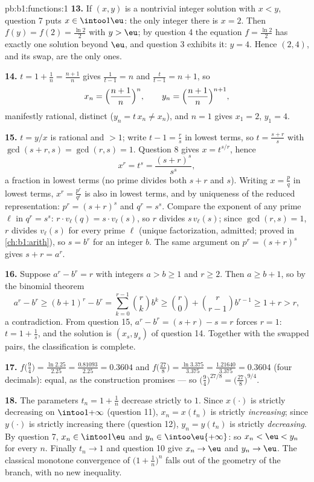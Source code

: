 \begin{solution}{pb:b1:functions:1}
\textbf{13.} If $(x, y)$ is a nontrivial integer solution with $x
< y$, question 7 puts $x \in \intoo1\eu$: the only integer there
is $x = 2$. Then $f(y) = f(2) = \frac{\ln2}2$ with $y > \eu$; by
question 4 the equation $f = \frac{\ln2}2$ has exactly one
solution beyond $\eu$, and question 3 exhibits it: $y = 4$. Hence
$(2, 4)$, and its swap, are the only ones.

\textbf{14.} $t = 1 + \frac1n = \frac{n+1}n$ gives $\frac1{t - 1}
= n$ and $\frac t{t-1} = n + 1$, so
\[
x_n = \Bigl(\frac{n+1}n\Bigr)^{n},
\qquad
y_n = \Bigl(\frac{n+1}n\Bigr)^{n+1},
\]
manifestly rational, distinct ($y_n = t\,x_n \neq x_n$), and $n =
1$ gives $x_1 = 2$, $y_1 = 4$.

\textbf{15.} $t = y/x$ is rational and $> 1$; write $t - 1 =
\frac rs$ in lowest terms, so $t = \frac{s + r}s$ with $\gcd(s +
r, s) = \gcd(r, s) = 1$. Question 8 gives $x = t^{s/r}$, hence
\[
x^r = t^s = \frac{(s+r)^s}{s^s} ,
\]
a fraction in lowest terms (no prime divides both $s + r$ and
$s$). Writing $x = \frac pq$ in lowest terms, $x^r = \frac{p^r}
{q^r}$ is also in lowest terms, and by uniqueness of the reduced
representation: $p^r = (s+r)^s$ and $q^r = s^s$. Compare the
exponent of any prime $\ell$ in $q^r = s^s$: $r \cdot
v_\ell(q) = s \cdot v_\ell(s)$, so $r$ divides $s\,v_\ell(s)$;
since $\gcd(r, s) = 1$, $r$ divides $v_\ell(s)$ for every prime
$\ell$ (unique factorization, admitted; proved in
\cref{ch:b1:arith}), so $s = b^r$ for an integer $b$. The same
argument on $p^r = (s+r)^s$ gives $s + r = a^r$.

\textbf{16.} Suppose $a^r - b^r = r$ with integers $a > b \geq 1$
and $r \geq 2$. Then $a \geq b + 1$, so by the binomial theorem
\[
a^r - b^r \geq (b+1)^r - b^r
= \sum_{k=0}^{r-1}\binom rk b^k
\geq \binom r0 + \binom r{r-1} b^{r-1}
\geq 1 + r > r ,
\]
a contradiction. From question 15, $a^r - b^r = (s + r) - s = r$
forces $r = 1$: $t = 1 + \frac1s$, and the solution is $(x_s,
y_s)$ of question 14. Together with the swapped pairs, the
classification is complete.

\textbf{17.} $f\bigl(\tfrac94\bigr) = \frac{\ln 2.25}{2.25} =
\frac{0.81093}{2.25} = 0.3604$ and $f\bigl(\tfrac{27}8\bigr) =
\frac{\ln 3.375}{3.375} = \frac{1.21640}{3.375} = 0.3604$ (four
decimals): equal, as the construction promises --- so
$\bigl(\tfrac94\bigr)^{27/8} = \bigl(\tfrac{27}8\bigr)^{9/4}$.

\textbf{18.} The parameters $t_n = 1 + \frac1n$ decrease strictly
to $1$. Since $x(\cdot)$ is strictly decreasing on
$\intoo1{+\infty}$ (question 11), $x_n = x(t_n)$ is strictly
\emph{increasing}; since $y(\cdot)$ is strictly increasing there
(question 12), $y_n = y(t_n)$ is strictly \emph{decreasing}. By
question 7, $x_n \in \intoo1\eu$ and $y_n \in
\intoo\eu{+\infty}$: so $x_n < \eu < y_n$ for every $n$. Finally
$t_n \to 1$ and question 10 give $x_n \to \eu$ and $y_n \to \eu$.
The classical monotone convergence of $\bigl(1 +
\frac1n\bigr)^n$ falls out of the geometry of the branch, with no
new inequality.


\end{solution}
